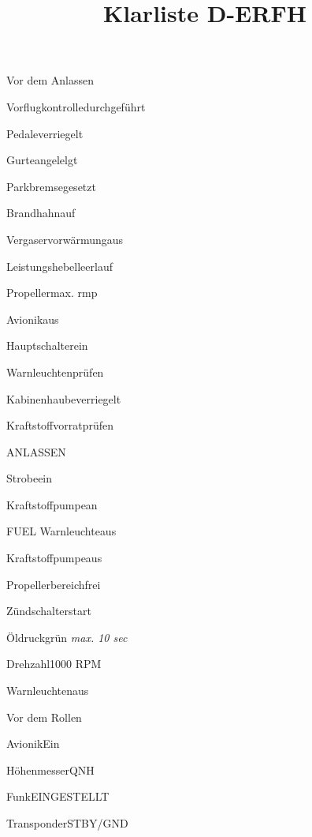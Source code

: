 



\title{Klarliste D-ERFH}

\begin{task}
  \begin{checklist}{Vor dem Anlassen}
    \item{Vorflugkontrolle}{durchgeführt}
    \item{Pedale}{verriegelt}
    \item{Gurte}{angelelgt}
    \item{Parkbremse}{gesetzt}
    \item{Brandhahn}{auf}
    \item{Vergaservorwärmung}{aus}
    \item{Leistungshebel}{leerlauf}
    \item{Propeller}{max. rmp}
    \item{Avionik}{aus}
    \item{Hauptschalter}{ein}
    \item{Warnleuchten}{prüfen}
    \item{Kabinenhaube}{verriegelt}
    \item{Kraftstoffvorrat}{prüfen}
  \end{checklist}
\end{task}

\begin{task}
  \begin{checklist}{ANLASSEN}
    \item{Strobe}{ein}
    \item{Kraftstoffpumpe}{an}
    \item{FUEL Warnleuchte}{aus}
    \item{Kraftstoffpumpe}{aus}
    \item{Propellerbereich}{frei}
    \item{Zündschalter}{start}
    \item{Öldruck}{grün \textit{max. 10 sec}}
    \item{Drehzahl}{1000 RPM}
    \item{Warnleuchten}{aus}
  \end{checklist}
\end{task}

\begin{task}
  \begin{checklist}{Vor dem Rollen}
    \item{Avionik}{Ein}
    \item{Höhenmesser}{QNH}
    \item{Funk}{EINGESTELLT}
    \item{Transponder}{STBY/GND}
  \end{checklist}
\end{task}

